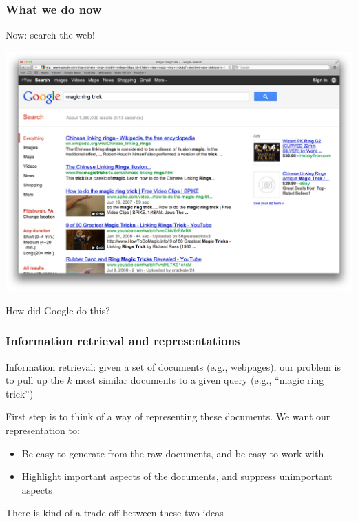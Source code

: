 \documentclass[mathserif]{beamer}
\def\red{\color[rgb]{0.8,0,0}}
\begin{document}
\begin{frame}
\frametitle{What we do now}
{\red Now: search the web!}
\begin{center}
\includegraphics[height=0.7\textheight]{googlesearch.png}
\end{center}

\vspace{-10pt}
How did Google do this?
\end{frame}

\begin{frame}
\frametitle{Information retrieval and representations}
{\red Information retrieval}:
given a set of documents (e.g., webpages), 
our problem is to pull up the $k$ most similar documents 
to a given query (e.g., ``magic ring trick'')

\bigskip
First step is to think of a way of {\red representing}
these documents. We want our representation to:
\begin{itemize}
\item Be easy to generate from the raw documents, and 
be easy to work with
\item Highlight important aspects of the documents, and
suppress unimportant aspects
\end{itemize}

\bigskip
There is kind of a {\red trade-off} between these two ideas
\end{frame}
\end{document}
